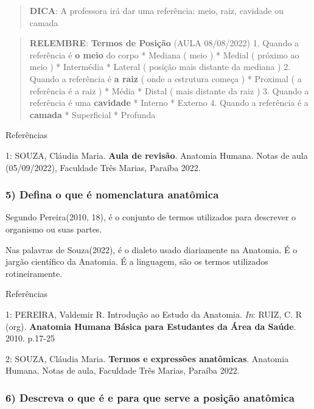\documentclass[
]{book}
\begin{document}
\begin{quote}
\textbf{DICA}: A professora irá dar uma referência: meio, raiz, cavidade ou camada
\end{quote}

\begin{quote}
\textbf{RELEMBRE}: \textbf{Termos de Posição} (AULA 08/08/2022)
1. Quando a referência é \textbf{o meio} do corpo
* Mediana ( meio )
* Medial ( próximo ao meio )
* Intermédia
* Lateral ( posição mais distante da mediana )
2. Quando a referência é \textbf{a raiz} ( onde a estrutura começa )
* Proximal ( a referência é a raiz )
* Média
* Distal ( mais distante da raiz )
3. Quando a referência é uma \textbf{cavidade}
* Interno
* Externo
4. Quando a referência é a \textbf{camada}
* Superficial
* Profunda
\end{quote}

Referências

1: SOUZA, Cláudia Maria. \textbf{Aula de revisão}. Anatomia Humana. Notas de aula (05/09/2022), Faculdade Três Marias, Paraíba 2022.

\hypertarget{defina-o-que-uxe9-nomenclatura-anatuxf4mica}{%
\subsubsection*{5) Defina o que é nomenclatura anatômica}\label{defina-o-que-uxe9-nomenclatura-anatuxf4mica}}

Segundo Pereira(2010, 18), é o conjunto de termos utilizados para descrever o organismo ou suas partes.

Nas palavras de Souza(2022), é o dialeto usado diariamente na Anatomia. É o jargão científico da Anatomia. É a linguagem, são os termos utilizados rotineiramente.

Referências

1: PEREIRA, Valdemir R. Introdução ao Estudo da Anatomia. \emph{In}: RUIZ, C. R (org). \textbf{Anatomia Humana Básica para Estudantes da Área da Saúde}. 2010. p.17-25

2: SOUZA, Cláudia Maria. \textbf{Termos e expressões anatômicas}. Anatomia Humana. Notas de aula, Faculdade Três Marias, Paraíba 2022.

\hypertarget{descreva-o-que-uxe9-e-para-que-serve-a-posiuxe7uxe3o-anatuxf4mica}{%
\subsubsection*{6) Descreva o que é e para que serve a posição anatômica}\label{descreva-o-que-uxe9-e-para-que-serve-a-posiuxe7uxe3o-anatuxf4mica}}
\end{document}
